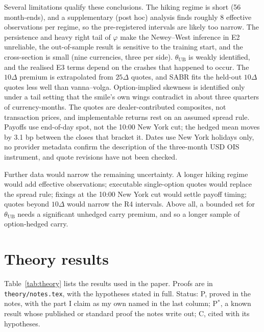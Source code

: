 \documentclass[11pt]{article}
\theoremstyle{result}
\newcommand{\thUB}{\theta_{\mathrm{UB}}}
\newcommand{\D}{\Delta}
\begin{document}
Several limitations qualify these conclusions. The hiking regime is short (56 month-ends), and a supplementary (post hoc) analysis finds roughly 8 effective observations per regime, so the pre-registered intervals are likely too narrow. The persistence and heavy right tail of $\varphi$ make the Newey--West inference in E2 unreliable, the out-of-sample result is sensitive to the training start, and the cross-section is small (nine currencies, three per side). $\thUB$ is weakly identified, and the realised E3 terms depend on the crashes that happened to occur. The $10\D$ premium is extrapolated from $25\D$ quotes, and SABR fits the held-out $10\D$ quotes less well than vanna--volga. Option-implied skewness is identified only under a tail setting that the smile's own wings contradict in about three quarters of currency-months. The quotes are dealer-contributed composites, not transaction prices, and implementable returns rest on an assumed spread rule. Payoffs use end-of-day spot, not the 10:00 New York cut; the hedged mean moves by 3.1 bp between the closes that bracket it. Dates use New York holidays only, no provider metadata confirm the description of the three-month USD OIS instrument, and quote revisions have not been checked.

Further data would narrow the remaining uncertainty. A longer hiking regime would add effective observations; executable single-option quotes would replace the spread rule; fixings at the 10:00 New York cut would settle payoff timing; quotes beyond $10\D$ would narrow the R4 intervals. Above all, a bounded set for $\thUB$ needs a significant unhedged carry premium, and so a longer sample of option-hedged carry.

\clearpage
\appendix

\section{Theory results}\label{app:theory}

Table~\ref{tab:theory} lists the results used in the paper. Proofs are in \texttt{theory/notes.tex}, with the hypotheses stated in full. Status: P, proved in the notes, with the part I claim as my own named in the last column; P$^*$, a known result whose published or standard proof the notes write out; C, cited with its hypotheses.
\end{document}
